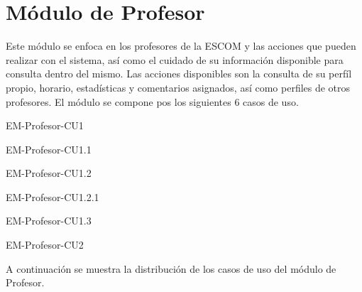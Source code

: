 

\section{Módulo de Profesor}

\noindent
Este módulo se enfoca en los profesores de la ESCOM y las acciones que pueden realizar con el sistema, así
como el cuidado de su información disponible para consulta dentro del mismo. Las acciones disponibles son la
consulta de su perfíl propio, horario, estadísticas y comentarios asignados, así como perfiles de otros profesores.
El módulo se compone pos los siguientes 6 casos de uso.

\begin{requisitos}{EM-Profesor-CU1}
\end{requisitos}

\begin{requisitos}{EM-Profesor-CU1.1}
\end{requisitos}

\begin{requisitos}{EM-Profesor-CU1.2}
\end{requisitos}

\begin{requisitos}{EM-Profesor-CU1.2.1}
\end{requisitos}

\begin{requisitos}{EM-Profesor-CU1.3}
\end{requisitos}

\begin{requisitos}{EM-Profesor-CU2}
\end{requisitos}

\noindent
A continuación se muestra la distribución de los casos de uso del módulo de Profesor.

